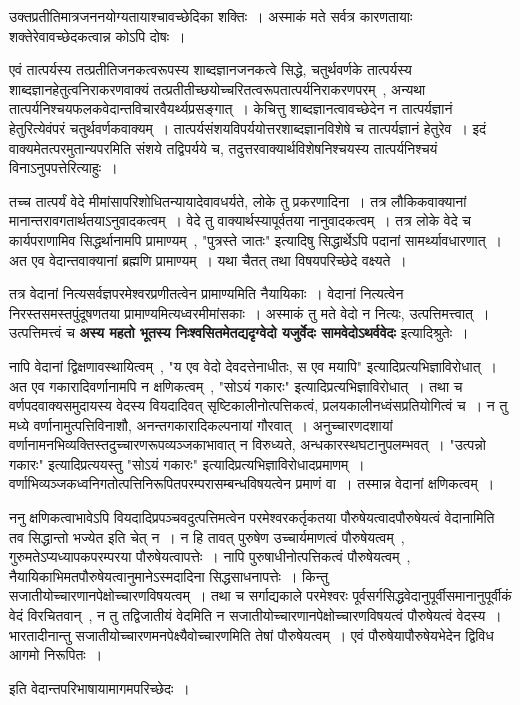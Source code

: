 	उक्तप्रतीतिमात्रजननयोग्यतायाश्चावच्छेदिका शक्तिः~। अस्माकं मते सर्वत्र कारणतायाः शक्तेरेवावच्छेदकत्वान्न कोऽपि दोषः~।\par
	एवं तात्पर्यस्य तत्प्रतीतिजनकत्वरूपस्य शाब्दज्ञानजनकत्वे सिद्धे, चतुर्थवर्णके तात्पर्यस्य शाब्दज्ञानहेतुत्वनिराकरणवाक्यं तत्प्रतीतीच्छयोच्चरितत्वरूपतात्पर्यनिराकरणपरम्~, अन्यथा तात्पर्यनिश्चयफलकवेदान्तविचारवैयर्थ्यप्रसङ्गात्~। केचित्तु शाब्दज्ञानत्वावच्छेदेन न तात्पर्यज्ञानं हेतुरित्येवंपरं चतुर्थवर्णकवाक्यम्~। तात्पर्यसंशयविपर्ययोत्तरशाब्दज्ञानविशेषे च तात्पर्यज्ञानं हेतुरेव~। इदं वाक्यमेतत्परमुतान्यपरमिति संशये तद्विपर्यये च, तदुत्तरवाक्यार्थविशेषनिश्चयस्य तात्पर्यनिश्चयं विनाऽनुपपत्तेरित्याहुः~।\par
	तच्च तात्पर्यं वेदे मीमांसापरिशोधितन्यायादेवावधर्यते, लोके तु प्रकरणादिना~। तत्र लौकिकवाक्यानां मानान्तरावगतार्थतयाऽनुवादकत्वम्~। वेदे तु वाक्यार्थस्यापूर्वतया नानुवादकत्वम्~। तत्र लोके वेदे च कार्यपराणामिव सिद्धर्थानामपि प्रामाण्यम्~, "पुत्रस्ते जातः" इत्यादिषु सिद्धार्थेऽपि पदानां सामर्थ्यावधारणात्~। अत एव वेदान्तवाक्यानां ब्रह्मणि प्रामाण्यम्~। यथा चैतत् तथा विषयपरिच्छेदे वक्ष्यते~।\par
	तत्र वेदानां नित्यसर्वज्ञपरमेश्वरप्रणीतत्वेन प्रामाण्यमिति नैयायिकाः~। वेदानां नित्यत्वेन निरस्तसमस्तपुंदूषणतया प्रामाण्यमित्यध्वरमीमांसकाः~। अस्माकं तु मते वेदो न नित्यः, उत्पत्तिमत्त्वात्~। उत्पत्तिमत्त्वं च {\bfseries अस्य महतो भूतस्य निःश्वसितमेतद्यदृग्वेदो यजुर्वेदः सामवेदोऽथर्ववेदः} इत्यादिश्रुतेः~।\par
	नापि वेदानां द्विक्षणावस्थायित्वम्~, "य एव वेदो देवदत्तेनाधीतः, स एव मयापि" इत्यादिप्रत्यभिज्ञाविरोधात्~। अत एव गकारादिवर्णानामपि न क्षणिकत्वम्~, "सोऽयं गकारः" इत्यादिप्रत्यभिज्ञाविरोधात्~। तथा च वर्णपदवाक्यसमुदायस्य वेदस्य वियदादिवत् सृष्टिकालीनोत्पत्तिकत्वं, प्रलयकालीनध्वंसप्रतियोगित्वं च~। न तु मध्ये वर्णानामुत्पत्तिविनाशौ, अनन्तगकारादिकल्पनायां गौरवात्~। अनुच्चारणदशायां वर्णानामनभिव्यक्तिस्तदुच्चारणरूपव्यञ्जकाभावात् न विरुध्यते, अन्धकारस्थघटानुपलम्भवत्~। "उत्पन्नो गकारः" इत्यादिप्रत्ययस्तु "सोऽयं गकारः" इत्यादिप्रत्यभिज्ञाविरोधादप्रमाणम्~। वर्णाभिव्यञ्जकध्वनिगतोत्पत्तिनिरूपितपरम्परासम्बन्धविषयत्वेन प्रमाणं वा~। तस्मान्न वेदानां क्षणिकत्वम्~।\par
	ननु क्षणिकत्वाभावेऽपि वियदादिप्रपञ्चवदुत्पत्तिमत्वेन परमेश्वरकर्तृकतया पौरुषेयत्वादपौरुषेयत्वं वेदानामिति तव सिद्धान्तो भज्येत इति चेत् न~। न हि तावत् पुरुषेण उच्चार्यमाणत्वं पौरुषेयत्वम्~, गुरुमतेऽप्यध्यापकपरम्परया पौरुषेयत्वापत्तेः~। नापि पुरुषाधीनोत्पत्तिकत्वं पौरुषेयत्वम्~, नैयायिकाभिमतपौरुषेयत्वानुमानेऽस्मदादिना सिद्धसाधनापत्तेः~। किन्तु सजातीयोच्चारणानपेक्षोच्चारणविषयत्वम्~। तथा च सर्गाद्यकाले परमेश्वरः पूर्वसर्गसिद्धवेदानुपूर्वीसमानानुपूर्वीकं वेदं विरचितवान्~, न तु तद्विजातीयं वेदमिति न सजातीयोच्चारणानपेक्षोच्चारणविषयत्वं पौरुषेयत्वं वेदस्य~। भारतादीनान्तु सजातीयोच्चारणमनपेक्ष्यैवोच्चारणमिति तेषां पौरुषेयत्वम्~। एवं पौरुषेयापौरुषेयभेदेन द्विविध आगमो निरूपितः~।\\
	\begin{center} इति वेदान्तपरिभाषायामागमपरिच्छेदः~।\end{center} 
